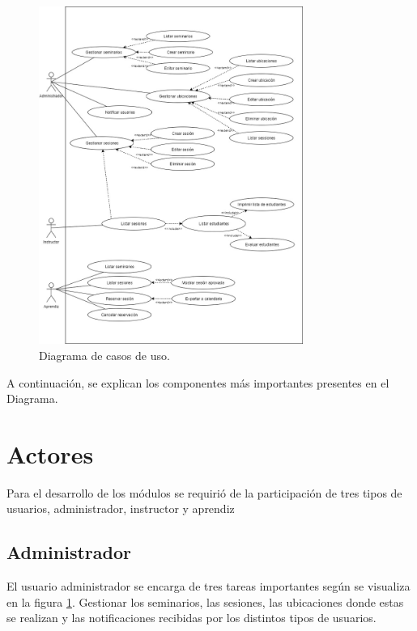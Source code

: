 \begin{figure}[h]
	\begin{center}
		\includegraphics[width=0.77\textwidth]{figuras/diagramaCasosDeUso.jpg}
		\caption{Diagrama de casos de uso.} \label{fig:diagramaCasosDeUso}
	\end{center}
\end{figure}

A continuación, se explican los componentes más importantes presentes en el Diagrama.

	\section{Actores} %
	\label{sec:usuarios}

	Para el desarrollo de los módulos se requirió de la participación de tres tipos de usuarios, administrador, instructor y aprendiz

		\subsection{Administrador} %
		\label{sub:administrador}
		
		El usuario administrador se encarga de tres tareas importantes según se visualiza en la figura \ref{fig:diagramaCasosDeUso}. Gestionar los seminarios, las sesiones, las ubicaciones donde estas se realizan y las notificaciones recibidas por los distintos tipos de usuarios.

